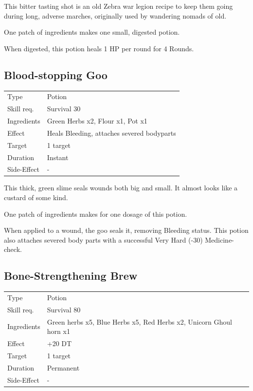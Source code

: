 \documentclass[11pt,a4paper,twocolumn]{book}
\begin{document}
\medskip

This bitter tasting shot is an old Zebra war legion recipe to keep them going during long, adverse marches, originally used by wandering nomads of old.

One patch of ingredients makes one small, digested potion.

When digested, this potion heals 1 HP per round for 4 Rounds.


\subsection*{Blood-stopping Goo}
{
	\begin{tabu} to 75mm{| X[l,4] | X[l,8] |}
		\hline
		Type 			& Potion 												\\
        Skill req.	    & Survival 30 									\\
        Ingredients     & Green Herbs x2, Flour x1, Pot x1						\\
        Effect     		& Heals Bleeding, attaches severed bodyparts 			\\
        Target      	& 1 target												\\
        Duration  		& Instant	 											\\
        Side-Effect     & -														\\ \hline
	\end{tabu}
		
}

\medskip

This thick, green slime seals wounds both big and small. It almost looks like a custard of some kind.

One patch of ingredients makes for one dosage of this potion.

When applied to a wound, the goo seals it, removing Bleeding status. This potion also attaches severed body parts with a successful Very Hard (-30) Medicine-check.
\vfill

\subsection*{Bone-Strengthening Brew}
{
	\begin{tabu} to 75mm{| X[l,4] | X[l,8] |}
		\hline
		Type 			& Potion 																\\
        Skill req.	    & Survival 80 															\\
        Ingredients     & Green herbs x5, Blue Herbs x5, Red Herbs x2, Unicorn Ghoul horn x1	\\
        Effect     		& +20 DT 																\\
        Target      	& 1 target																\\
        Duration  		& Permanent	 															\\
        Side-Effect     & -																		\\ \hline
	\end{tabu}
		
}
\end{document}
